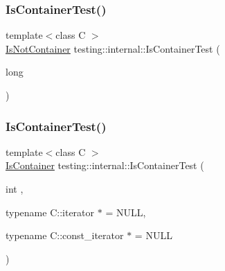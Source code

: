 \mbox{\label{namespacetesting_1_1internal_af545a2ae928b8a9e7581978234464275}} 
\subsubsection{\texorpdfstring{IsContainerTest()}{IsContainerTest()}\hspace{0.1cm}{\footnotesize\ttfamily [2/3]}}
{\footnotesize\ttfamily template$<$class C $>$ \\
\mbox{\hyperlink{namespacetesting_1_1internal_abf080521ce135deb510e0a7830fd3d33}{Is\+Not\+Container}} testing\+::internal\+::\+Is\+Container\+Test (\begin{DoxyParamCaption}\item[{long}]{ }\end{DoxyParamCaption})}

\mbox{\label{namespacetesting_1_1internal_acb6ea1086293c1d6636e3c67941351fb}} 
\subsubsection{\texorpdfstring{IsContainerTest()}{IsContainerTest()}\hspace{0.1cm}{\footnotesize\ttfamily [3/3]}}
{\footnotesize\ttfamily template$<$class C $>$ \\
\mbox{\hyperlink{namespacetesting_1_1internal_ad8f0c2883245f1df2a53618a49f0deb3}{Is\+Container}} testing\+::internal\+::\+Is\+Container\+Test (\begin{DoxyParamCaption}\item[{int}]{,  }\item[{typename C\+::iterator $\ast$}]{ = {\ttfamily NULL},  }\item[{typename C\+::const\+\_\+iterator $\ast$}]{ = {\ttfamily NULL} }\end{DoxyParamCaption})}

\mbox{\label{namespacetesting_1_1internal_a4bd96b7fa6486802d33ddc217af55a39}} 
